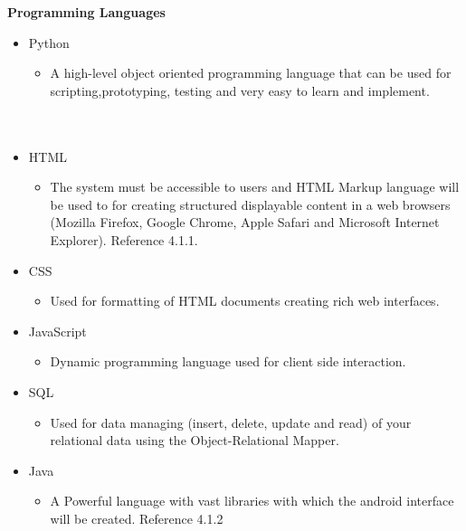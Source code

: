 \documentclass[12pt]{article}
\begin{document}
		\indent\indent \textbf{Programming Languages}
		\begin{itemize}
			\item Python
			\begin{itemize}
			\item A high-level object oriented programming language that can be used for scripting,prototyping, testing and very easy to learn and implement.\\\\\\
			\end{itemize}
			\item HTML
			\begin{itemize}
			\item The system must be accessible to users and HTML Markup language will be used to for 	creating structured displayable content in a web browsers (Mozilla Firefox, Google Chrome, Apple Safari and Microsoft Internet Explorer). Reference 4.1.1.
			\end{itemize}
			\item CSS
			\begin{itemize}
			\item Used for formatting of HTML documents creating rich web interfaces.
			\end{itemize}
			\item JavaScript
			\begin{itemize}
			\item Dynamic programming language used for client side interaction.
			\end{itemize}
			\item SQL
			\begin{itemize}
			\item Used for data managing (insert, delete, update and read) of your relational data using the Object-Relational Mapper.
			\end{itemize}
			\item Java
			\begin{itemize}
			\item A Powerful language with vast libraries with which the android interface will be created. Reference 4.1.2
			\end{itemize}
		\end{itemize}
		
\end{document}
